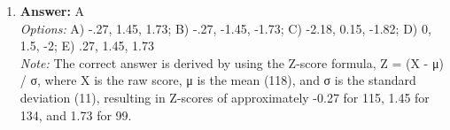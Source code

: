 \documentclass[12pt]{article}
\begin{document}
\begin{enumerate}[label=\arabic*.]
\\ \textit{Note:} Operant conditioning allows researchers to reinforce a dog's response to specific sound frequencies, enabling them to measure the animal's sensitivity to those frequencies through behavioral changes in response to auditory stimuli.
\item \textbf{Answer:} A
\\ \textit{Options:} A) -.27, 1.45, 1.73; B) -.27, -1.45, -1.73; C) -2.18, 0.15, -1.82; D) 0, 1.5, -2; E) .27, 1.45, 1.73
\\ \textit{Note:} The correct answer is derived by using the Z-score formula, Z = (X - μ) / σ, where X is the raw score, μ is the mean (118), and σ is the standard deviation (11), resulting in Z-scores of approximately -0.27 for 115, 1.45 for 134, and 1.73 for 99.
\end{enumerate}
\end{document}
